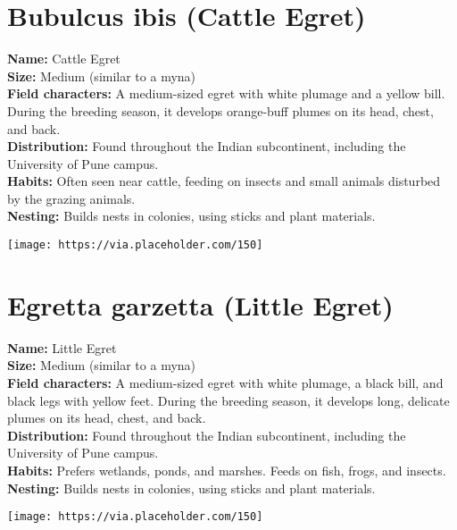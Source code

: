 \documentclass[a5paper,12pt]{memoir}
\begin{document}
\section*{Bubulcus ibis (Cattle Egret)}
\textbf{Name:} Cattle Egret \\
\textbf{Size:} Medium (similar to a myna) \\
\textbf{Field characters:} A medium-sized egret with white plumage and a yellow bill. During the breeding season, it develops orange-buff plumes on its head, chest, and back. \\
\textbf{Distribution:} Found throughout the Indian subcontinent, including the University of Pune campus. \\
\textbf{Habits:} Often seen near cattle, feeding on insects and small animals disturbed by the grazing animals. \\
\textbf{Nesting:} Builds nests in colonies, using sticks and plant materials. \\
\begin{flushright}
\texttt{[image: https://via.placeholder.com/150]}
\end{flushright}

\newpage

\section*{Egretta garzetta (Little Egret)}
\textbf{Name:} Little Egret \\
\textbf{Size:} Medium (similar to a myna) \\
\textbf{Field characters:} A medium-sized egret with white plumage, a black bill, and black legs with yellow feet. During the breeding season, it develops long, delicate plumes on its head, chest, and back. \\
\textbf{Distribution:} Found throughout the Indian subcontinent, including the University of Pune campus. \\
\textbf{Habits:} Prefers wetlands, ponds, and marshes. Feeds on fish, frogs, and insects. \\
\textbf{Nesting:} Builds nests in colonies, using sticks and plant materials. \\
\begin{flushright}
\texttt{[image: https://via.placeholder.com/150]}
\end{flushright}

\newpage
\end{document}
